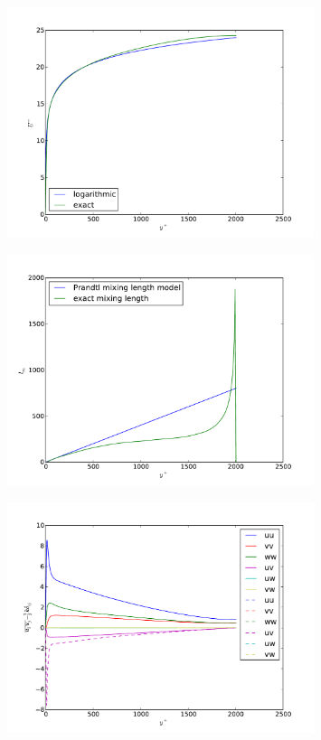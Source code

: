 \documentclass[12pt]{article}
\begin{document}
\begin{figure}[h!]
\centering
\includegraphics[width=0.8\textwidth]{figure_1.pdf}
\end{figure}

\begin{figure}[h!]
\centering
\includegraphics[width=0.8\textwidth]{figure_2.pdf}
\end{figure}

\begin{figure}[h!]
\centering
\includegraphics[width=0.8\textwidth]{figure_3.pdf}
\end{figure}
\end{document}
